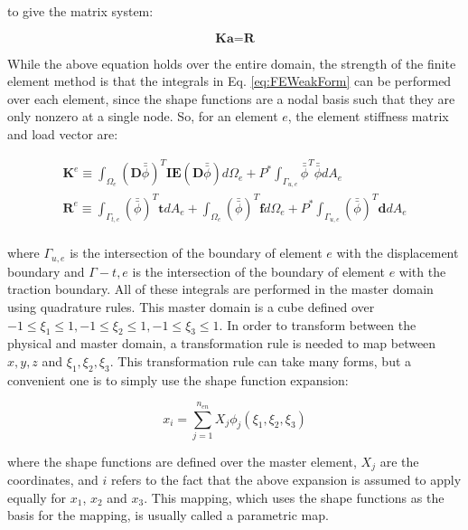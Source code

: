 \documentclass[10pt]{article}
\begin{document}
to give the matrix system:

\begin{equation}
\textbf{K}\textbf{a}=\textbf{R}
\end{equation}

While the above equation holds over the entire domain, the strength of the finite element method is that the integrals in Eq. \eqref{eq:FEWeakForm} can be performed over each element, since the shape functions are a nodal basis such that they are only nonzero at a single node. So, for an element \(e\), the element stiffness matrix and load vector are:

\begin{equation}
\label{eq:FEWeakForm_element}
\begin{aligned}
\textbf{K}^e\equiv\int_{\Omega_e}(\textbf{D}\bar{\bar{\phi}})^T\textbf{IE}(\textbf{D}\bar{\bar{\phi}})d\Omega_e +P^{*}\int_{\Gamma_{u,e}}\bar{\bar{\phi}}^T\bar{\bar{\phi}}dA_e\\
\textbf{R}^e\equiv\int_{\Gamma_{t,e}}(\bar{\bar{\phi}})^T\textbf{t}dA_e+\int_{\Omega_e}(\bar{\bar{\phi}})^T\textbf{f}d\Omega_e+P^{*}\int_{\Gamma_{u,e}}(\bar{\bar{\phi}})^T\textbf{d}dA_e\\
\end{aligned}
\end{equation}

where \(\Gamma_{u,e}\) is the intersection of the boundary of element \(e\) with the displacement boundary and \(\Gamma-{t,e}\) is the intersection of the boundary of element \(e\) with the traction boundary. All of these integrals are performed in the master domain using quadrature rules. This master domain is a cube defined over \(-1\leq\xi_1\leq1, -1\leq\xi_2\leq1, -1\leq\xi_3\leq1\). In order to transform between the physical and master domain, a transformation rule is needed to map between \(x,y,z\) and \(\xi_1,\xi_2,\xi_3\). This transformation rule can take many forms, but a convenient one is to simply use the shape function expansion:

\begin{equation}
x_i=\sum_{j=1}^{n_{en}}X_j\phi_j(\xi_1,\xi_2,\xi_3)
\end{equation}

where the shape functions are defined over the master element, \(X_j\) are the coordinates, and \(i\) refers to the fact that the above expansion is assumed to apply equally for \(x_1\), \(x_2\) and \(x_3\). This mapping, which uses the shape functions as the basis for the mapping, is usually called a parametric map. 
\end{document}
